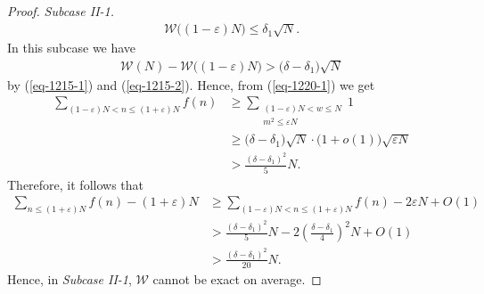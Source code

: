 \documentclass[12pt,a4paper,reqno]{amsart}
\numberwithin{equation}{section}
\theoremstyle{plain}
\theoremstyle{definition}
\begin{document}
\begin{proof}
{\it Subcase II-1.}  
\begin{align}\label{eq-1215-2}
\mathcal{W}\Big((1-\varepsilon)N\Big)\le\delta_1 \sqrt{N}.
\end{align} 
In this subcase we have 
\begin{align}\label{eq-1220-1}
\mathcal{W}(N)-\mathcal{W}\Big((1-\varepsilon)N\Big)>\big(\delta-\delta_1\big)\sqrt{N}
\end{align} 
by (\ref{eq-1215-1}) and (\ref{eq-1215-2}). Hence, from (\ref{eq-1220-1}) we get
\begin{align*}
\sum_{(1-\varepsilon)N<n\le (1+\varepsilon)N}f(n)&\ge \sum_{\substack{(1-\varepsilon)N<w\le N\\ m^2\le \varepsilon N}}1\\
& \ge \big(\delta-\delta_1\big)\sqrt{N}\cdot\Big(1+o(1)\Big)\sqrt{\varepsilon N}\\
&>\frac{(\delta-\delta_1)^2}{5}N.
\end{align*}
Therefore, it follows that
\begin{align*}
\sum_{n\le (1+\varepsilon)N}f(n)-(1+\varepsilon)N&\ge \sum_{(1-\varepsilon)N<n\le (1+\varepsilon)N}f(n)-2\varepsilon N+O(1)\\
&>\frac{(\delta-\delta_1)^2}{5}N- 2\left(\frac{\delta-\delta_1}{4}\right)^2N+O(1)\\
&>\frac{(\delta-\delta_1)^2}{20}N.
\end{align*}
Hence, in {\it Subcase II-1}, $\mathcal{W}$ cannot be exact on average. 


\end{proof}
\end{document}
